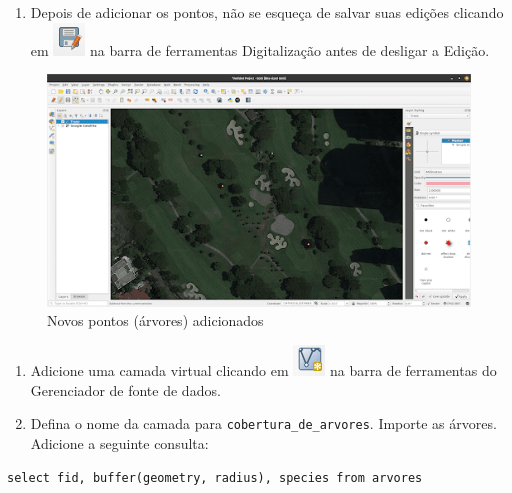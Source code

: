 \documentclass[
]{krantz}
\providecommand{\tightlist}{%
  \setlength{\itemsep}{0pt}\setlength{\parskip}{0pt}}
\begin{document}
\begin{enumerate}
\def\labelenumi{\arabic{enumi}.}
\setcounter{enumi}{7}
\tightlist
\item
  Depois de adicionar os pontos, não se esqueça de salvar suas edições clicando em \includegraphics{media/modulo2/symbol-save-edits.png} na barra de ferramentas Digitalização antes de desligar a Edição.
\end{enumerate}

\begin{figure}
\centering
\includegraphics{media/modulo2/virtual-4.png}
\caption{Novos pontos (árvores) adicionados}
\end{figure}

\begin{enumerate}
\def\labelenumi{\arabic{enumi}.}
\setcounter{enumi}{8}
\tightlist
\item
  Adicione uma camada virtual clicando em \includegraphics{media/modulo2/symbol-virtual.png}
  na barra de ferramentas do Gerenciador de fonte de dados.
\item
  Defina o nome da camada para \texttt{cobertura\_de\_arvores}. Importe as árvores. Adicione a seguinte consulta:
\end{enumerate}

\begin{verbatim}
select fid, buffer(geometry, radius), species from arvores
\end{verbatim}
\end{document}
